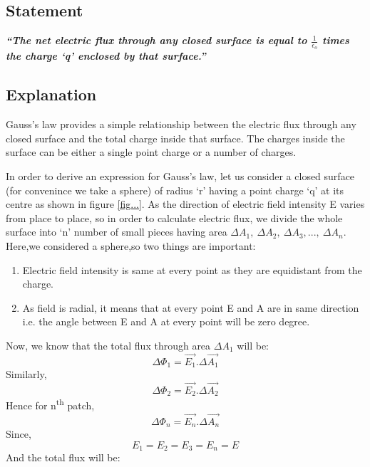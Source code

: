\subsection*{Statement}
\textbf{\textit{“The net electric flux through any closed surface is equal to $\frac{1}{\epsilon_{o}}$
times the charge ‘q’ enclosed by that surface.”}}
\subsection*{Explanation}
Gauss’s law provides a simple relationship between the electric flux
through any closed surface and the total charge inside that surface.
The charges inside the surface can
be either a single point charge or a number of charges.

In order to derive an expression for Gauss’s law,
let us consider a closed surface (for convenince we take a sphere)
of radius `r' having a point charge ‘q’
at its centre as shown in figure \ref{fig...}.
As the direction of electric field intensity E varies from place to place,
so in order to calculate electric flux, we divide the whole surface into ‘n’
number of small pieces having area $\Delta A_{1},\:\Delta A_{2},\:\Delta A_{3},...,\:\Delta A_{n}$.
Here,we considered a sphere,so two things are important:
\begin{enumerate}[label=(\roman*)]
  \item Electric field intensity is same at every point as they are equidistant from the charge.
  \item As field is radial, it means that at every point E and A are in same direction i.e. the angle between E and A at every point will be zero degree.
\end{enumerate}
Now, we know that the total flux through area $\Delta A_{1}$ will be:
\begin{equation}
  \Delta \Phi_{1} = \vec{E_{1}}.\Delta \vec{A_{1}} \nonumber
\end{equation}
Similarly,
\begin{equation}
  \Delta \Phi_{2} = \vec{E_{2}}.\Delta \vec{A_{2}} \nonumber
\end{equation}
Hence for n\textsuperscript{th} patch, 
\begin{equation}
  \Delta \Phi_{n} = \vec{E_{n}}.\Delta \vec{A_{n}} \nonumber
\end{equation}
Since,
\begin{equation}
  E_{1} = E_{2} = E_{3} = E_{n} = E \nonumber
\end{equation}
And the total flux will be:
